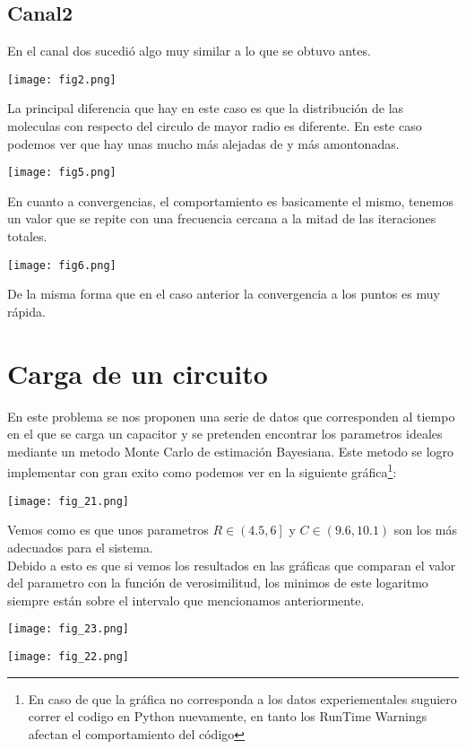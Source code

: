 \documentclass[]{article}
\begin{document}
\subsection{Canal2}
En el canal dos sucedi\'o algo muy similar a lo que se obtuvo antes.
\begin{center}
  \texttt{[image: fig2.png]}
\end{center}
La principal diferencia que hay en este caso es que la distribuci\'on de las moleculas con respecto del circulo de mayor radio es diferente. En este caso podemos ver que hay unas mucho m\'as alejadas de y m\'as amontonadas.
\begin{center}
  \texttt{[image: fig5.png]}
\end{center}
En cuanto a convergencias, el comportamiento es basicamente el mismo, tenemos un valor que se repite con una frecuencia cercana a la mitad de las iteraciones totales.
\begin{center}
  \texttt{[image: fig6.png]}
\end{center}
De la misma forma que en el caso anterior la convergencia a los puntos es muy r\'apida.\\
\newpage
\section{Carga de un circuito}
En este problema se nos proponen una serie de datos que corresponden al tiempo en el que se carga un capacitor y se pretenden encontrar los parametros ideales mediante un metodo Monte Carlo de estimaci\'on Bayesiana. Este metodo se logro implementar con gran exito como podemos ver en la siguiente gr\'afica\footnote{En caso de que la gr\'afica no corresponda a los datos experiementales suguiero correr el codigo en Python nuevamente, en tanto los RunTime Warnings afectan el comportamiento del c\'odigo}:
\begin{center}
  \texttt{[image: fig\_21.png]}
\end{center}
Vemos como es que unos parametros $R\in \left(4.5 , 6 \right]$ y $C \in \left(9.6 , 10.1 \right)$ son los m\'as adecuados para el sistema.\\

Debido a esto es que si vemos los resultados en las gr\'aficas que comparan el valor del parametro con la funci\'on de verosimilitud, los minimos de este logaritmo siempre est\'an sobre el intervalo que mencionamos anteriormente.

\begin{center}
  \texttt{[image: fig\_23.png]}
\end{center}


\begin{center}
  \texttt{[image: fig\_22.png]}
\end{center}
\end{document}
